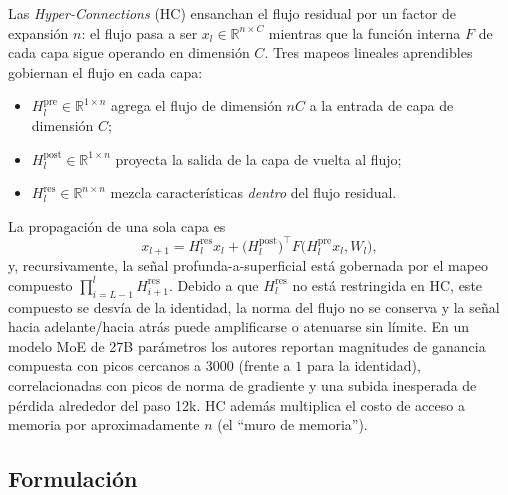 Las \emph{Hyper-Connections} (HC) \citep{xie_mhc_2025} ensanchan el flujo
residual por un factor de expansión $n$: el flujo pasa a ser
$x_l \in \mathbb{R}^{n \times C}$ mientras que la función interna $F$ de cada
capa sigue operando en dimensión $C$. Tres mapeos lineales aprendibles
gobiernan el flujo en cada capa:
\begin{itemize}[leftmargin=*]
    \item $H^{\text{pre}}_l \in \mathbb{R}^{1 \times n}$ agrega el flujo de
        dimensión $nC$ a la entrada de capa de dimensión $C$;
    \item $H^{\text{post}}_l \in \mathbb{R}^{1 \times n}$ proyecta la salida de
        la capa de vuelta al flujo;
    \item $H^{\text{res}}_l \in \mathbb{R}^{n \times n}$ mezcla características
        \emph{dentro} del flujo residual.
\end{itemize}
La propagación de una sola capa es
\[
x_{l+1} = H^{\text{res}}_l x_l + \big(H^{\text{post}}_l\big)^{\!\top}
F\big(H^{\text{pre}}_l x_l, W_l\big),
\]
y, recursivamente, la señal profunda-a-superficial está gobernada por el mapeo
compuesto $\prod_{i=L-1}^{l} H^{\text{res}}_{i+1}$. Debido a que
$H^{\text{res}}_l$ no está restringida en HC, este compuesto se desvía de la
identidad, la norma del flujo no se conserva y la señal hacia adelante/hacia
atrás puede amplificarse o atenuarse sin límite. En un modelo MoE de 27B
parámetros los autores reportan magnitudes de ganancia compuesta con picos
cercanos a $3000$ (frente a $1$ para la identidad), correlacionadas con picos
de norma de gradiente y una subida inesperada de pérdida alrededor del paso
12k. HC además multiplica el costo de acceso a memoria por aproximadamente $n$
(el ``muro de memoria'').

\subsection{Formulación}

